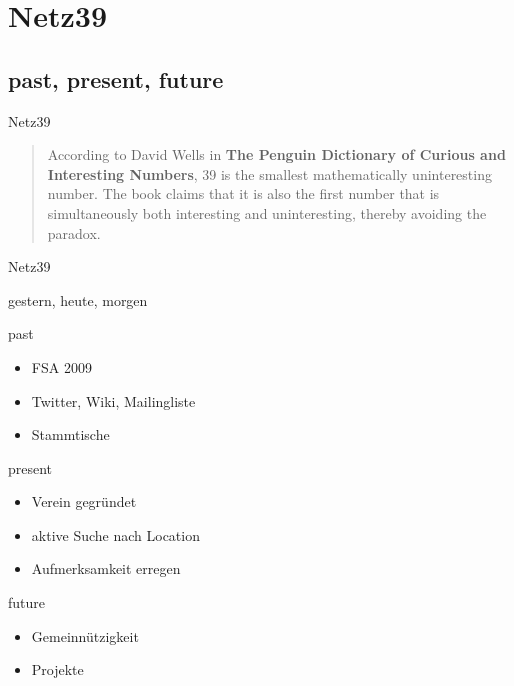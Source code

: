 \documentclass[hyperref={pdfpagelabels=false}]{beamer}
\begin{document}
\section{Netz39}

\subsection{past, present, future}

\begin{frame}{Netz39}
    \begin{quote}
        According to David Wells in \textbf{The Penguin Dictionary of Curious and
        Interesting Numbers}, 39 is the smallest mathematically uninteresting
        number. The book claims that it is also the first number that is
        simultaneously both interesting and uninteresting, thereby avoiding the
        paradox. \cite{Wikipedia2010}
    \end{quote}
\end{frame}{Netz39}

\begin{frame}{gestern, heute, morgen}
    \begin{block}{past}
        \begin{itemize}
            \item FSA 2009
            \item Twitter, Wiki, Mailingliste
            \item Stammtische
        \end{itemize}
    \end{block}
    \pause
    \begin{block}{present}
        \begin{itemize}
            \item Verein gegründet
            \item aktive Suche nach Location
            \item Aufmerksamkeit erregen
        \end{itemize}
    \end{block}
    \pause
    \begin{block}{future}
        \begin{itemize}
            \item Gemeinnützigkeit
            \item Projekte
        \end{itemize}
    \end{block}
\end{frame}
\end{document}

